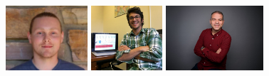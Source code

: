 \documentclass[paperwidth=40in,paperheight=32in,landscape]{baposter} %
\newcommand{\headshotsize}{0.95in}
\begin{document}
\begin{poster}
{\includegraphics[height=\headshotsize, trim={3cm, 0cm, 3cm, 0cm}, clip=true]{headshot_sage}
\hspace{.5cm}
\includegraphics[height=\headshotsize, trim={5.1cm, 6cm, 2cm, 0cm}, clip=true]{headshot_zack}
\hspace{.5cm}
\includegraphics[height=\headshotsize, trim={21cm, 20cm, 18cm, 2cm}, clip=true]{headshot_daniele}
}


\end{poster}
\end{document}
